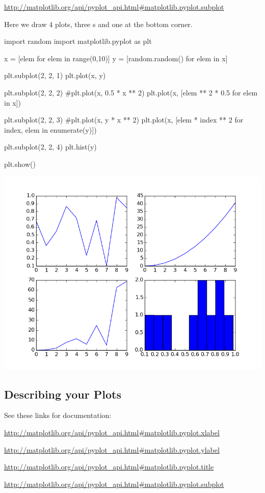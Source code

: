 \documentclass[11pt]{cselabheader}
\begin{document}
\begin{center}
\url{http://matplotlib.org/api/pyplot_api.html#matplotlib.pyplot.subplot}
\end{center}

Here we draw 4 plots, three s and one
 at the bottom corner.

\begin{python3code}
import random
import matplotlib.pyplot as plt

x = [elem for elem in range(0,10)]
y = [random.random() for elem in x]

plt.subplot(2, 2, 1)
plt.plot(x, y)

plt.subplot(2, 2, 2)
#plt.plot(x, 0.5 * x ** 2)
plt.plot(x, [elem ** 2 * 0.5 for elem in x])

plt.subplot(2, 2, 3)
#plt.plot(x, y * x ** 2)
plt.plot(x, [elem * index ** 2 for index, elem in enumerate(y)])

plt.subplot(2, 2, 4)
plt.hist(y)

plt.show()
\end{python3code}

\begin{center}
  \includegraphics[width=\textwidth]{img/matplotlib_subplot.png}
\end{center}

\subsection{Describing your Plots}
See these links for documentation:
\begin{center}
\url{http://matplotlib.org/api/pyplot_api.html#matplotlib.pyplot.xlabel}

\url{http://matplotlib.org/api/pyplot_api.html#matplotlib.pyplot.ylabel}

\url{http://matplotlib.org/api/pyplot_api.html#matplotlib.pyplot.title}

\url{http://matplotlib.org/api/pyplot_api.html#matplotlib.pyplot.subplot}
\end{center}
\end{document}
